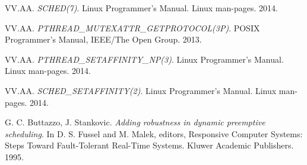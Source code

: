 \documentclass[paper=a4, fontsize=11pt]{scrartcl}
\numberwithin{equation}{section}        %
\numberwithin{figure}{section}          %
\numberwithin{table}{section}               %
\numberwithin{fragment}{section}
\begin{document}
\begin{thebibliography}{99}

  VV.AA.
  \textit{SCHED(7)}.
  Linux Programmer's Manual.
  Linux man-pages.
  2014.

  VV.AA.
  \textit{PTHREAD\_MUTEXATTR\_GETPROTOCOL(3P)}.
  POSIX Programmer's Manual,
  IEEE/The Open Group.
  2013.

  VV.AA.
  \textit{PTHREAD\_SETAFFINITY\_NP(3)}.
  Linux Programmer's Manual.
  Linux man-pages.
  2014.

  VV.AA.
  \textit{SCHED\_SETAFFINITY(2)}.
  Linux Programmer's Manual.
  Linux man-pages.
  2014.

  G. C. Buttazzo, J. Stankovic.
  \textit{Adding robustness in dynamic preemptive scheduling}.
  In D. S. Fussel and M. Malek, editors, Responsive Computer Systems: Steps Toward Fault-Tolerant Real-Time Systems.
  Kluwer Academic Publishers.
  1995.

\end{thebibliography}



\end{document}
